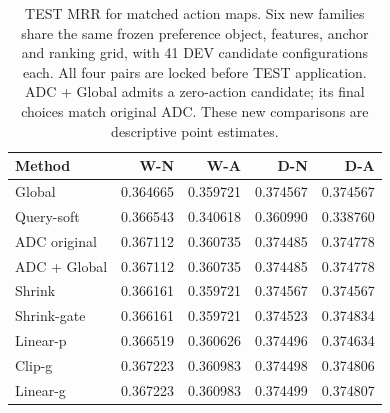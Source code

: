 \begin{table}[htbp]
\centering\footnotesize
\setlength{\tabcolsep}{4pt}
\caption{TEST MRR for matched action maps. Six new families share the same frozen preference object, features, anchor and ranking grid, with 41 DEV candidate configurations each. All four pairs are locked before TEST application. ADC + Global admits a zero-action candidate; its final choices match original ADC. These new comparisons are descriptive point estimates.}
\label{tab:matched-test}
\begin{tabular}{lrrrr}
\toprule
Method & W-N & W-A & D-N & D-A\\
\midrule
Global & 0.364665 & 0.359721 & 0.374567 & 0.374567\\
Query-soft & 0.366543 & 0.340618 & 0.360990 & 0.338760\\
ADC original & 0.367112 & 0.360735 & 0.374485 & 0.374778\\
ADC + Global & 0.367112 & 0.360735 & 0.374485 & 0.374778\\
Shrink & 0.366161 & 0.359721 & 0.374567 & 0.374567\\
Shrink-gate & 0.366161 & 0.359721 & 0.374523 & 0.374834\\
Linear-p & 0.366519 & 0.360626 & 0.374496 & 0.374634\\
Clip-g & 0.367223 & 0.360983 & 0.374498 & 0.374806\\
Linear-g & 0.367223 & 0.360983 & 0.374499 & 0.374807\\
\bottomrule
\end{tabular}
\end{table}
